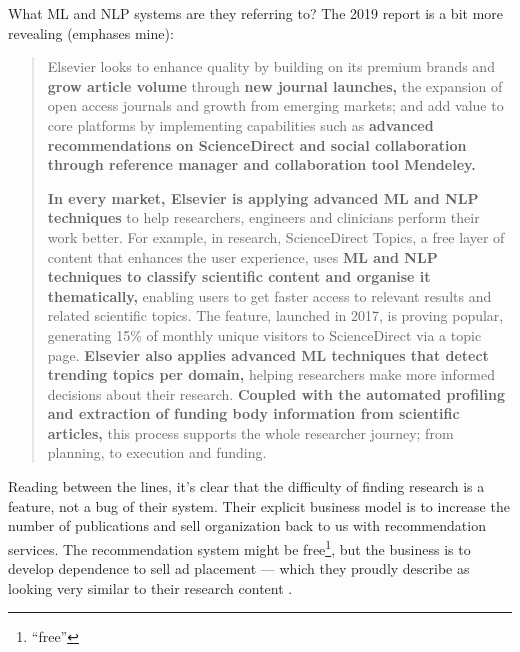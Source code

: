\documentclass[10pt]{article}
\begin{document}
\begin{multicols}{2}
What ML and NLP systems are they referring to? The 2019 report is a bit
more revealing (emphases mine):

\begin{quote}
Elsevier looks to enhance quality by building on its premium brands and
\textbf{grow article volume} through \textbf{new journal launches,} the
expansion of open access journals and growth from emerging markets; and
add value to core platforms by implementing capabilities such as
\textbf{advanced recommendations on ScienceDirect and social
collaboration through reference manager and collaboration tool
Mendeley.}

\textbf{In every market, Elsevier is applying advanced ML and NLP
techniques} to help researchers, engineers and clinicians perform their
work better. For example, in research, ScienceDirect Topics, a free
layer of content that enhances the user experience, uses \textbf{ML and
NLP techniques to classify scientific content and organise it
thematically,} enabling users to get faster access to relevant results
and related scientific topics. The feature, launched in 2017, is proving
popular, generating 15\% of monthly unique visitors to ScienceDirect via
a topic page. \textbf{Elsevier also applies advanced ML techniques that
detect trending topics per domain,} helping researchers make more
informed decisions about their research. \textbf{Coupled with the
automated profiling and extraction of funding body information from
scientific articles,} this process supports the whole researcher
journey; from planning, to execution and funding. \cite{RELXAnnualReport2019} 
\end{quote}

Reading between the lines, it's clear that the difficulty of finding
research is a feature, not a bug of their system. Their explicit
business model is to increase the number of publications and sell
organization back to us with recommendation services. The recommendation
system might be free\footnote{``free''}, but the business is to develop
dependence to sell ad placement --- which they proudly describe as
looking very similar to their research content \cite{springernatureBrandedContent, elsevier360AdvertisingSolutions} .


\end{multicols}
\end{document}
